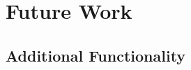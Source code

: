 \chapter{Future Work} %
\label{Chapter9} %
\section{Additional Functionality}
\par 
\subsection{}
\par 


\par 

\subsection{}

\par 

\section{}

\par 

\par 

\section{}

